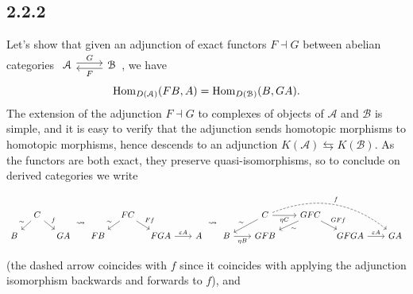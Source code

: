\documentclass[deligne.tex]{subfiles}
\begin{document}
\subsection*{2.2.2}
Let's show that given an adjunction of exact functors $F\dashv G$ between
abelian categories 
$\begin{tikzcd}\mathcal A\arrow[r,"G",shift left]&\mathcal B\arrow[l,"F",shift left]\end{tikzcd}$, we have
\begin{equation*}
	\operatorname{Hom}_{D(\mathcal A)}(FB,A)=\operatorname{Hom}_{D(\mathcal B)}(B,GA).
\end{equation*}
The extension of the adjunction $F\dashv G$ to complexes of objects of 
$\mathcal A$ and $\mathcal B$ is simple, and it is easy to verify that
the adjunction sends homotopic morphisms to homotopic morphisms, hence
descends to an adjunction $K(\mathcal A)\leftrightarrows K(\mathcal B)$.
As the functors are both exact, they preserve quasi-isomorphisms, so to
conclude on derived categories we write
{\small\begin{ceqn}\begin{equation*}
\begin{tikzcd}[column sep=10pt,row sep=10pt]
	&C\arrow[dl,"\sim"']\arrow[dr,"f"] \\
	B&&GA
\end{tikzcd}
\rightsquigarrow
\begin{tikzcd}[column sep=10pt,row sep=10pt]
	&FC\arrow[dl,"\sim"']\arrow[dr,"Ff"] \\
	FB&&FGA\arrow[r,"\vep A"]&[10pt]A
\end{tikzcd}
\rightsquigarrow
\begin{tikzcd}[column sep=10pt,row sep=10pt]
	&[10pt]C\arrow[drrr,dashed,bend left,"f"]\arrow[r,"\eta C"']\arrow[dl,"\sim"']&[10pt]GFC\arrow[dl,"\sim"]\arrow[dr,"GFf"] \\
	B\arrow[r,"\eta B"']&GFB&&GFGA\arrow[r,"\vep A"]&[10pt]GA
\end{tikzcd}
\end{equation*}\end{ceqn}}
(the dashed arrow coincides with $f$ since it coincides with applying
the adjunction isomorphism backwards and forwards to $f$), and
\end{document}
